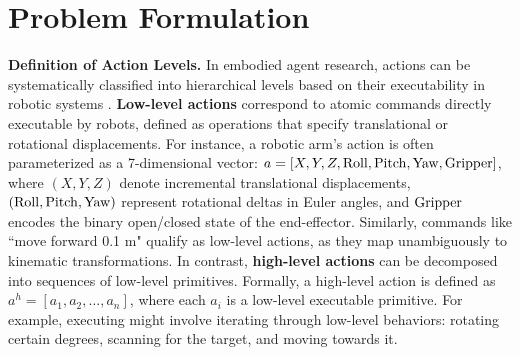 \section{Problem Formulation}\label{sec:problem_formulation}
\vspace{-5pt}
\textbf{Definition of Action Levels.}\label{sec:action_level}
In embodied agent research, actions can be systematically classified into hierarchical levels based on their executability in robotic systems \cite{ma2024survey,belkhale2024rt}. \textbf{Low-level actions} correspond to atomic commands directly executable by robots, defined as operations that specify translational or rotational displacements. For instance, a robotic arm’s action is often parameterized as a 7-dimensional vector:
$\label{eq:low_level_action}
    a=[X, Y, Z, \rm{Roll}, \rm{Pitch}, \rm{Yaw}, \rm{Gripper}]$,
where $(X, Y, Z)$ denote incremental translational displacements, $(\rm{Roll}, \rm{Pitch}, \rm{Yaw})$ represent rotational deltas in Euler angles, and \(\rm{Gripper}\) encodes the binary open/closed state of the end-effector. Similarly, commands like ``move forward 0.1 m" qualify as low-level actions, as they map unambiguously to kinematic transformations.  
In contrast, \textbf{high-level actions} can be decomposed into sequences of low-level primitives. Formally, a high-level action is defined as \(a^h = [a_1, a_2, \ldots, a_n]\), where each \(a_i\) is a low-level executable primitive. For example, executing  might involve iterating through low-level behaviors: rotating certain degrees, scanning for the target, and moving towards it. 



